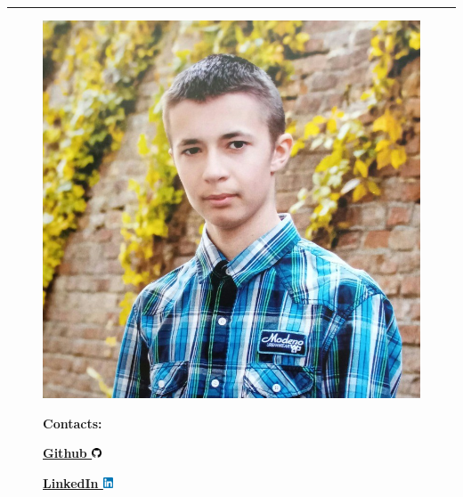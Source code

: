 \hypersetup{
    colorlinks=false,
    urlbordercolor=white
}


\par\noindent\rule{\textwidth}{0.1mm}

\begin{figure}
    \begin{flushright}
        \includegraphics[width=0.2\linewidth]{images/profile.jpeg}

        {
            \vspace{0.5cm}
            \textbf{\large{Contacts:}}
            
            \vspace{0.2cm}
            \textbf{
                {\href{https://github.com/LostHopes}{Github \includegraphics[width=0.30cm]{images/github.png}}}
            }

            \vspace{0.2cm}
            \textbf{
                {\href{https://www.linkedin.com/in/arsen-melnychuk-840b5126b/}{LinkedIn \includegraphics[width=0.30cm]{images/linkedin.png}}}
            }
        }
    \end{flushright}
\end{figure}
